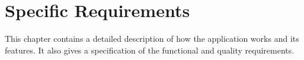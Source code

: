 \chapter{Specific Requirements}
This chapter contains a detailed description of how the application works and its features. It also gives a specification of the functional and quality requirements.

	
	
	

	

	

	